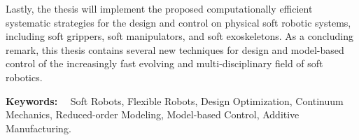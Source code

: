 Lastly, the thesis will implement the proposed computationally efficient systematic strategies for the design and control on physical soft robotic systems, including soft grippers, soft manipulators, and soft exoskeletons. As a concluding remark, this thesis contains several new techniques for design and model-based control of the increasingly fast evolving and multi-disciplinary field of soft robotics.



\vspace*{5pt}\noindent
\textbf{Keywords:} \ \ Soft Robots, Flexible Robots, Design Optimization, Continuum Mechanics, Reduced-order Modeling, Model-based Control, Additive Manufacturing.
